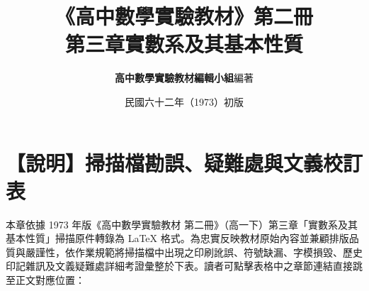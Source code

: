 \documentclass[a4paper,12pt,twoside]{article}
\title{\LARGE\textbf{《高中數學實驗教材》第二冊}\\[0.5em] \Large\textbf{第三章\quad 實數系及其基本性質}}
\author{\textbf{高中數學實驗教材編輯小組}\quad 編著}
\date{民國六十二年（1973）初版}
\begin{document}
\maketitle
\thispagestyle{firstpage}

\section*{【說明】掃描檔勘誤、疑難處與文義校訂表}
\label{sec:errata_notes}

本章依據 1973 年版《高中數學實驗教材 第二冊》（高一下）第三章「實數系及其基本性質」掃描原件轉錄為 \LaTeX{} 格式。為忠實反映教材原始內容並兼顧排版品質與嚴謹性，依作業規範將掃描檔中出現之印刷訛誤、符號缺漏、字模損毀、歷史印記雜訊及文義疑難處詳細考證彙整於下表。讀者可點擊表格中之章節連結直接跳至正文對應位置：
\end{document}
